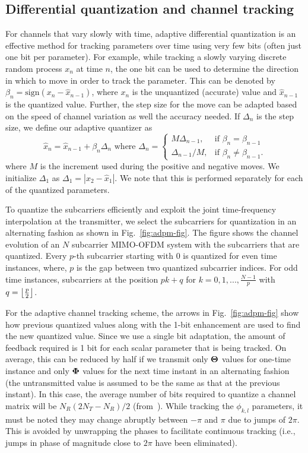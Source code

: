 \documentclass[journal,10pt,twocolumn]{IEEEtran}
\DeclarePairedDelimiter\floor{\lfloor}{\rfloor}
\begin{document}
\subsection{Differential quantization and channel tracking}
\label{quantiz}
For channels that vary slowly with time, adaptive differential
quantization is an effective method for tracking parameters over time
using very few bits (often just one bit per parameter). For example,
while tracking a slowly varying discrete random process $x_n$ at time
$n$, the one bit can be used to determine the direction in which to
move in order to track the parameter. This can be denoted by
$\beta_{n} = \mbox{sign}(x_{n} - \hat{x}_{n-1})$, where $x_n$ is the
unquantized (accurate) value and $\hat{x}_{n-1}$ is the quantized
value. Further, the step size for the move can be adapted based on the
speed of channel variation as well the accuracy needed. If $\Delta_n$
is the step size, we define our adaptive quantizer as
\begin{equation}
\hat{x}_{n} = \hat{x}_{n-1} + \beta_{n}\Delta_{n} \mbox{ where }
\label{delta_eqn}
\Delta_{n} = \begin{cases}
    M \Delta_{n-1}, & \text{if $\beta_{n} = \beta_{n-1}$}\\
    \Delta_{n-1}/M , & \text{if $\beta_{n} \neq \beta_{n-1}$}.
  \end{cases}
\end{equation}
where $M$ is the increment used during the positive and negative
moves. We initialize $\Delta_1$ as $\Delta_1 = |x_{2}-\hat{x}_1|$. We
note that this is performed separately for each of the quantized
parameters.

To quantize the subcarriers efficiently and exploit the joint
time-frequency interpolation at the transmitter, we select the
subcarriers for quantization in an alternating fashion as shown in
Fig.~\ref{fig:adpm-fig}. The figure shows the channel evolution of an
$N$ subcarrier MIMO-OFDM system with the subcarriers that are
quantized. Every $p$-th subcarrier starting with $0$ is quantized for
even time instances, where, $p$ is the gap between two quantized
subcarrier indices. For odd time instances, subcarriers at the
position $pk+q$ for $k = 0,1,..., \frac{N-1}{p}$ with $q =
{\floor*{\frac{p}{2}}}$.

For the adaptive channel tracking scheme, the arrows in
Fig.~\ref{fig:adpm-fig} show how previous quantized values along with
the 1-bit enhancement are used to find the new quantized value. Since
we use a single bit adaptation, the amount of feedback required is 1
bit for each scalar parameter that is being tracked. On average, this
can be reduced by half if we transmit only $\bf{\Theta}$ values for
one-time instance and only $\bf{\Phi}$ values for the next time
instant in an alternating fashion (the untransmitted value is assumed
to be the same as that at the previous instant). In this case, the
average number of bits required to quantize a channel matrix will be
$N_{R}(2N_{T} - N_R )/2$ (from~\cite{4114278}). While tracking
the $\phi_{k,l}$ parameters, it must be noted they may change abruptly
between $-\pi$ and $\pi$ due to jumps of $2\pi$. This is avoided by
unwrapping the phases to facilitate continuous tracking (i.e., jumps
in phase of magnitude close to $2\pi$ have been eliminated).
\end{document}
